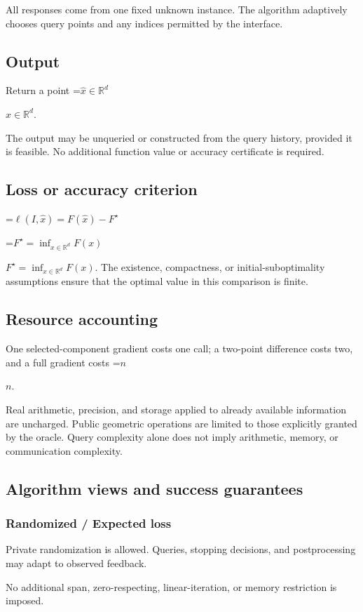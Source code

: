 \documentclass[10pt,a4paper]{article}
\newcommand{\AtlasMath}[1]{\par\begingroup\centering\setbox0=\hbox{$\displaystyle #1$}\ifdim\wd0>1.4\linewidth\typeout{ATLAS WIDE FORMULA: \the\wd0}\fi\ifdim\wd0>\linewidth\resizebox{\linewidth}{!}{\box0}\else\box0\fi\par\endgroup}
\newcommand{\AtlasInlineMath}[1]{\begingroup\setbox0=\hbox{$#1$}\ifdim\wd0>.4\linewidth\endgroup\AtlasMath{#1}\else\endgroup$#1$\fi}
\begin{document}
All responses come from one fixed unknown instance. The algorithm adaptively chooses query points and any indices permitted by the interface.

\subsection{Output}
Return a point \AtlasInlineMath{\widehat x\in\mathbb R^d}.

The output may be unqueried or constructed from the query history, provided it is feasible. No additional function value or accuracy certificate is required.

\subsection{Loss or accuracy criterion}

\AtlasMath{\ell(I,\widehat{x})=F(\widehat{x})-F^\star}


\AtlasInlineMath{F^\star=\inf_{x\in \mathbb{R}^d}F(x)}. The existence, compactness, or initial-suboptimality assumptions ensure that the optimal value in this comparison is finite.

\subsection{Resource accounting}
One selected-component gradient costs one call; a two-point difference costs two, and a full gradient costs \AtlasInlineMath{n}.

Real arithmetic, precision, and storage applied to already available information are uncharged. Public geometric operations are limited to those explicitly granted by the oracle. Query complexity alone does not imply arithmetic, memory, or communication complexity.

\subsection{Algorithm views and success guarantees}
\subsubsection{Randomized / Expected loss}
Private randomization is allowed. Queries, stopping decisions, and postprocessing may adapt to observed feedback.

No additional span, zero-respecting, linear-iteration, or memory restriction is imposed.
\end{document}
